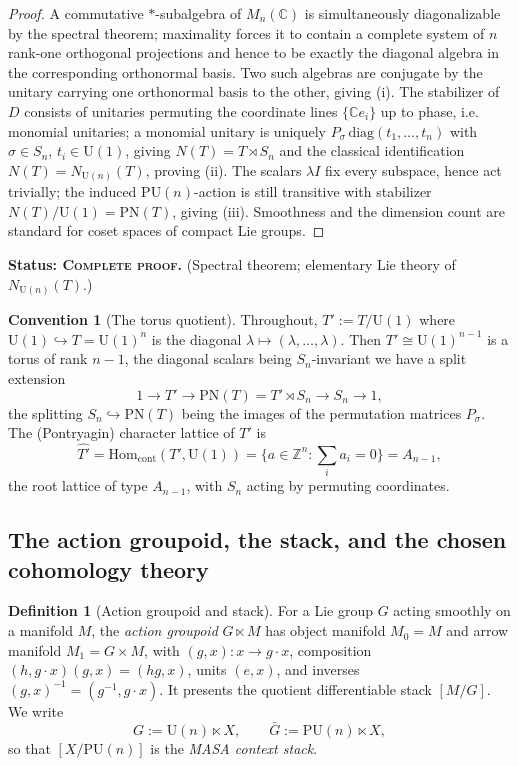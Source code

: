 \documentclass[11pt]{article}
\theoremstyle{definition}
\newtheorem{definition}[theorem]{Definition}
\newtheorem{convention}[theorem]{Convention}
\newcommand{\U}{\mathrm{U}}
\newcommand{\PU}{\mathrm{PU}}
\newcommand{\PN}{\mathrm{PN}}
\newcommand{\Nt}{N(T)}
\newcommand{\Z}{\mathbb{Z}}
\newcommand{\C}{\mathbb{C}}
\newcommand{\Hom}{\mathrm{Hom}}
\newcommand{\Tp}{T'}
\newcommand{\Thatp}{\widehat{T'}}
\newcommand{\STAT}[1]{\noindent\textbf{Status: #1}}
\newcommand{\COMPLETE}{\textsc{Complete proof}}
\begin{document}
\begin{proof}
A commutative $*$-subalgebra of $M_n(\C)$ is simultaneously diagonalizable by the spectral
theorem; maximality forces it to contain a complete system of $n$ rank-one orthogonal
projections and hence to be exactly the diagonal algebra in the corresponding orthonormal
basis. Two such algebras are conjugate by the unitary carrying one orthonormal basis to the
other, giving (i). The stabilizer of $D$ consists of unitaries permuting the coordinate
lines $\{\C e_i\}$ up to phase, i.e. monomial unitaries; a monomial unitary is uniquely
$P_\sigma\,\mathrm{diag}(t_1,\dots,t_n)$ with $\sigma\in S_n$, $t_i\in\U(1)$, giving
$\Nt=T\rtimes S_n$ and the classical identification $\Nt=N_{\U(n)}(T)$, proving (ii). The
scalars $\lambda I$ fix every subspace, hence act trivially; the induced $\PU(n)$-action is
still transitive with stabilizer $\Nt/\U(1)=\PN(T)$, giving (iii). Smoothness and the
dimension count are standard for coset spaces of compact Lie groups.
\end{proof}
\STAT{\COMPLETE.} (Spectral theorem; elementary Lie theory of $N_{\U(n)}(T)$.)

\begin{convention}[The torus quotient]\label{conv:torus}
Throughout, $\Tp:=T/\U(1)$ where $\U(1)\hookrightarrow T=\U(1)^n$ is the diagonal
$\lambda\mapsto(\lambda,\dots,\lambda)$. Then $\Tp\cong\U(1)^{n-1}$ is a torus of rank
$n-1$, the diagonal scalars being $S_n$-invariant we have a split extension
\begin{equation}\label{eq:PNsplit}
1\longrightarrow \Tp \longrightarrow \PN(T)=\Tp\rtimes S_n \longrightarrow S_n
\longrightarrow 1 ,
\end{equation}
the splitting $S_n\hookrightarrow\PN(T)$ being the images of the permutation matrices
$P_\sigma$. The (Pontryagin) character lattice of $\Tp$ is
\[
\Thatp=\Hom_{\mathrm{cont}}(\Tp,\U(1))=\{a\in\Z^n:\textstyle\sum_i a_i=0\}=A_{n-1},
\]
the root lattice of type $A_{n-1}$, with $S_n$ acting by permuting coordinates.
\end{convention}

\subsection{The action groupoid, the stack, and the chosen cohomology theory}

\begin{definition}[Action groupoid and stack]
For a Lie group $G$ acting smoothly on a manifold $M$, the \emph{action groupoid}
$G\ltimes M$ has object manifold $M_0=M$ and arrow manifold $M_1=G\times M$, with
$(g,x)\colon x\to g\cdot x$, composition $(h,g\cdot x)(g,x)=(hg,x)$, units $(e,x)$, and
inverses $(g,x)^{-1}=(g^{-1},g\cdot x)$. It presents the quotient differentiable stack
$[M/G]$. We write
\[
G:=\U(n)\ltimes X,\qquad \bar G:=\PU(n)\ltimes X ,
\]
so that $[X/\PU(n)]$ is the \emph{MASA context stack}.
\end{definition}
\end{document}
